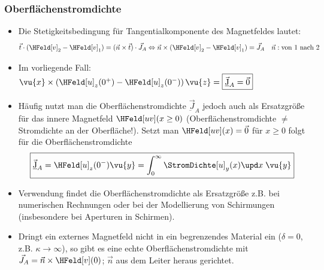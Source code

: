 \begin{frame}
  \frametitle{Oberflächenstromdichte}
  \begin{itemize}[<+->]
  \item Die Stetigkeitsbedingung für Tangentialkomponente des Magnetfeldes lautet:
    $$
    \vec{t}\cdot (\HFeld[v]_2 - \HFeld[v]_1) = (\vec{n} \times \vec{t})\cdot \vec{J}_A \Leftrightarrow \vec{n}\times (\HFeld[v]_2 - \HFeld[v]_1) = \vec{J}_A \quad \vec{n}: \text{von 1 nach 2}
    $$
  \item Im vorliegende Fall: $
    \vu{x} \times \left(\HFeld[u]_z(0^+) - \HFeld[u]_z(0^-)  \right) \vu{z} = \boxed{\vec{\underbar{J}}_A = \vec{0}} 
    $
  \item Häufig nutzt man die \alert{Oberflächenstromdichte} $\vec{\underbar{J}}_A$ jedoch auch als \alert{Ersatzgröße} für das innere Magnetfeld $\HFeld[uv](x\ge 0)$ (Oberflächenstromdichte $\ne$ Stromdichte an der Oberfläche!). Setzt man $\HFeld[uv](x) = \vec{0}$ für $x\ge 0$ folgt für die Oberflächenstromdichte
    $$
    \boxed{\vec{\underbar{J}}_A =\HFeld[u]_z(0^-) \vu{y} = \int_0^\infty \StromDichte[u]_y(x) \upd x \; \vu{y}}
    $$
\item Verwendung findet die Oberflächenstromdichte als Ersatzgröße z.B. bei numerischen Rechnungen oder bei der Modellierung von Schirmungen (insbesondere bei Aperturen in Schirmen).
\item Dringt ein externes Magnetfeld nicht in ein begrenzendes Material ein ($\delta=0$, z.B. $\kappa \to \infty$), so gibt es eine \alert{echte} Oberflächenstromdichte mit $\vec{J}_A = \vec{n} \times \HFeld[v](0)$; $\vec{n}$ aus dem Leiter heraus gerichtet.  
\end{itemize}
\end{frame}

